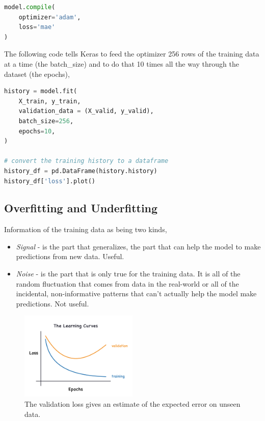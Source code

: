 \begin{lstlisting}[language=Python]
model.compile(
	optimizer='adam',
	loss='mae'
)
\end{lstlisting}

\noindent The following code tells Keras to feed the optimizer 256 rows of the training
data at a time (the batch\_size) and to do that 10 times all the way through the
dataset (the epochs),

\begin{lstlisting}[language=Python]
history = model.fit(
	X_train, y_train,
	validation_data = (X_valid, y_valid),
	batch_size=256,
	epochs=10,
)

# convert the training history to a dataframe
history_df = pd.DataFrame(history.history)
history_df['loss'].plot()
\end{lstlisting}

\subsection{Overfitting and Underfitting}
Information of the training data as being two kinds,
\begin{itemize}
	\item \emph{Signal} - is the part that generalizes, the part that can help
		the model to make predictions from new data. Useful.
	\item \emph{Noise} - is the part that is only true for the training data. It
		is all of the random fluctuation that comes from data in the real-world
		or all of the incidental, non-informative patterns that can't actually
		help the model make predictions. Not useful.
\end{itemize}

\begin{figure}[htp]
	\centering
	\includegraphics[width=0.5\textwidth]{../assets/machine_learning_random/signal_vs_noise.png}
	\caption{The validation loss gives an estimate of the expected error on unseen data.}
\end{figure}

